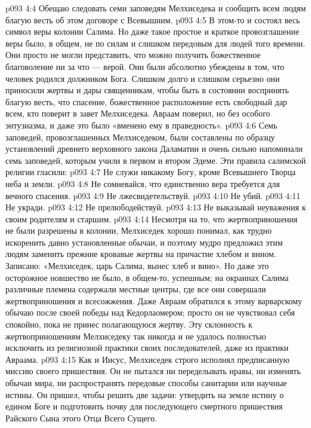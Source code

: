 \vs p093 4:4 \bibnobreakspace Обещаю следовать семи заповедям Мелхиседека и сообщить всем людям благую весть об этом договоре с Всевышним.
\vs p093 4:5 \pc В этом\hyp{}то и состоял весь символ веры колонии Салима. Но даже такое простое и краткое провозглашение веры было, в общем, не по силам и слишком передовым для людей того времени. Они просто не могли представить, что можно получить божественное благоволение ни за что --- верой. Они были абсолютно убеждены в том, что человек родился должником Бога. Слишком долго и слишком серьезно они приносили жертвы и дары священникам, чтобы быть в состоянии воспринять благую весть, что спасение, божественное расположение есть свободный дар всем, кто поверит в завет Мелхиседека. Авраам поверил, но без особого энтузиазма, и даже это было «вменено ему в праведность».
\vs p093 4:6 \pc Семь заповедей, провозглашенных Мелхиседеком, были составлены по образцу установлений древнего верховного закона Даламатии и очень сильно напоминали семь заповедей, которым учили в первом и втором Эдеме. Эти правила салимской религии гласили:
\vs p093 4:7 \bibnobreakspace Не служи никакому Богу, кроме Всевышнего Творца неба и земли.
\vs p093 4:8 \bibnobreakspace Не сомневайся, что единственно вера требуется для вечного спасения.
\vs p093 4:9 \bibnobreakspace Не лжесвидетельствуй.
\vs p093 4:10 \bibnobreakspace Не убий.
\vs p093 4:11 \bibnobreakspace Не укради.
\vs p093 4:12 \bibnobreakspace Не прелюбодействуй.
\vs p093 4:13 \bibnobreakspace Не выказывай неуважения к своим родителям и старшим.
\vs p093 4:14 \pc Несмотря на то, что жертвоприношения не были разрешены в колонии, Мелхиседек хорошо понимал, как трудно искоренить давно установленные обычаи, и поэтому мудро предложил этим людям заменить прежние кровавые жертвы на причастие хлебом и вином. Записано: «Мелхиседек, царь Салима, вынес хлеб и вино». Но даже это осторожное новшество не было, в общем\hyp{}то, успешным; на окраинах Салима различные племена содержали местные центры, где все они совершали жертвоприношения и всесожжения. Даже Авраам обратился к этому варварскому обычаю после своей победы над Кедорлаомером; просто он не чувствовал себя спокойно, пока не принес полагающуюся жертву. Эту склонность к жертвоприношениям Мелхиседеку так никогда и не удалось полностью исключить из религиозной практики своих последователей, даже из практики Авраама.
\vs p093 4:15 Как и Иисус, Мелхиседек строго исполнял предписанную миссию своего пришествия. Он не пытался ни переделывать нравы, ни изменять обычаи мира, ни распространять передовые способы санитарии или научные истины. Он пришел, чтобы решить две задачи: утвердить на земле истину о едином Боге и подготовить почву для последующего смертного пришествия Райского Сына этого Отца Всего Сущего.
